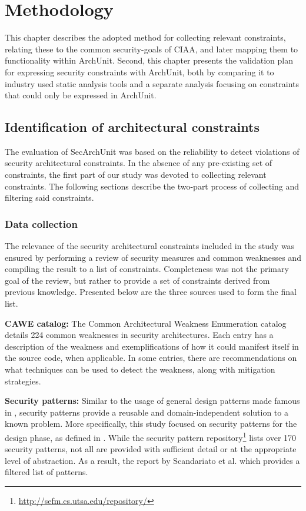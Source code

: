 \chapter{Methodology}

This chapter describes the adopted method for collecting relevant constraints, relating these to the common security-goals of CIAA, and later mapping them to functionality within ArchUnit. Second, this chapter presents the validation plan for expressing security constraints with ArchUnit, both by comparing it to industry used static analysis tools and a separate analysis focusing on constraints that could only be expressed in ArchUnit.

\section{Identification of architectural constraints}

The evaluation of SecArchUnit was based on the reliability to detect violations of security architectural constraints. In the absence of any pre-existing set of constraints, the first part of our study was devoted to collecting relevant constraints. The following sections describe the two-part process of collecting and filtering said constraints. 

\subsection{Data collection} \label{sec:data_collection}

The relevance of the security architectural constraints included in the study was ensured by performing a review of security measures and common weaknesses and compiling the result to a list of constraints. Completeness was not the primary goal of the review, but rather to provide a set of constraints derived from previous knowledge. Presented below are the three sources used to form the final list. 

\textbf{CAWE catalog:}
The Common Architectural Weakness Enumeration catalog \cite{santos_catalog_2017} details 224 common weaknesses in security architectures. Each entry has a description of the weakness and exemplifications of how it could manifest itself in the source code, when applicable. In some entries, there are recommendations on what techniques can be used to detect the weakness, along with mitigation strategies.

\textbf{Security patterns:}
Similar to the usage of general design patterns made famous in \cite{gamma_design_1995}, security patterns provide a reusable and domain-independent solution to a known problem. More specifically, this study focused on security patterns for the design phase, as defined in \cite{yoshioka_survey_2008}. While the security pattern repository\footnote{\url{http://sefm.cs.utsa.edu/repository/}} lists over 170 security patterns, not all are provided with sufficient detail or at the appropriate level of abstraction. As a result, the report by Scandariato et al. \cite{scandariato_system_2006}  which provides a filtered list of patterns.


